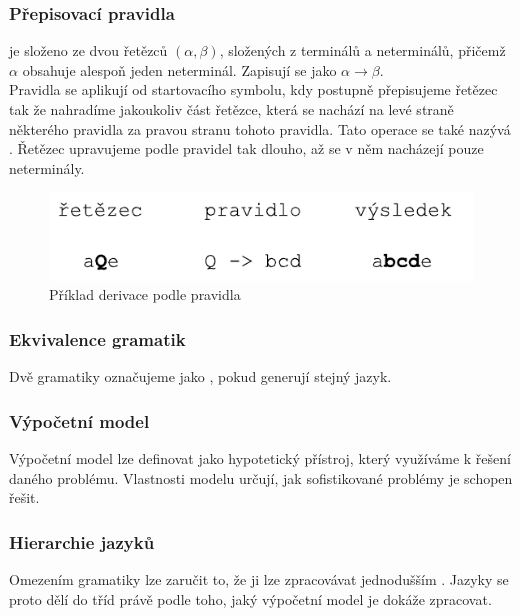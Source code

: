 \subsubsection*{Přepisovací pravidla}

 je složeno ze dvou řetězců $(\alpha, \beta)$,
složených z terminálů a neterminálů, přičemž $\alpha$ obsahuje alespoň jeden neterminál.
Zapisují se jako $\alpha \rightarrow \beta$.\\
Pravidla se aplikují od startovacího symbolu, kdy postupně přepisujeme řetězec tak že nahradíme
jakoukoliv část řetězce, která se nachází na levé straně některého pravidla za pravou stranu tohoto pravidla.
Tato operace se také nazývá .
Řetězec upravujeme podle pravidel tak dlouho, až se v něm nacházejí pouze neterminály.

\begin{figure}[H]
  \label{img:rewriteRule}
  \centering
  \includegraphics{fig/rewriteRule.pdf}
  \caption{Příklad derivace podle pravidla}
\end{figure}

\subsubsection*{Ekvivalence gramatik}
Dvě gramatiky označujeme jako , pokud generují stejný jazyk.

\subsubsection*{Výpočetní model}

Výpočetní model lze definovat jako hypotetický přístroj,
který využíváme k řešení daného problému. Vlastnosti modelu určují,
jak sofistikované problémy je schopen řešit.

\subsubsection*{Hierarchie jazyků} \label{chomsky:hierarchy}

Omezením gramatiky lze zaručit to, že ji lze zpracovávat jednodušším
. Jazyky se proto
dělí do tříd právě podle toho, jaký výpočetní model je dokáže zpracovat.\\

